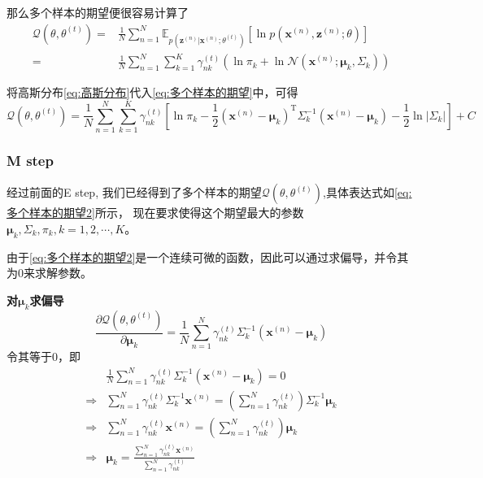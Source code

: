 \documentclass[withoutpreface,bwprint]{NoteBook}
\begin{document}
那么多个样本的期望便很容易计算了
\begin{align}
    \label{eq:多个样本的期望}
    \mathcal{Q}(\theta,\theta^{(t)}) 
    =& \frac{1}{N} \sum_{n=1}^{N} \mathbb{E}_{p(\mathbf{z}^{(n)}|\mathbf{x}^{(n)};\theta^{(t)})} \left[ \ln p(\mathbf{x}^{(n)},\mathbf{z}^{(n)};\theta)\right] \nonumber \\
    =& \frac{1}{N} \sum_{n=1}^{N} \sum_{k=1}^{K} \gamma_{nk}^{(t)} \left(\ln \pi_k + \ln \mathcal{N}(\mathbf{x}^{(n)}; \bm{\mu}_k,\Sigma_k )\right)
\end{align}

将高斯分布\cref{eq:高斯分布}代入\cref{eq:多个样本的期望}中，可得
\begin{equation}
    \label{eq:多个样本的期望2}
    \mathcal{Q}(\theta,\theta^{(t)}) 
    =  \frac{1}{N} \sum_{n=1}^{N} \sum_{k=1}^{K} \gamma_{nk}^{(t)} \left[ \ln \pi_k - \frac{1}{2} \left(\mathbf{x}^{(n)}-\bm{\mu}_k \right)^\mathrm{T} \Sigma_k^{-1} \left(\mathbf{x}^{(n)}-\bm{\mu}_k \right) - \frac{1}{2} \ln \left| \Sigma_k \right| \right] + C 
\end{equation}

\subsubsection{M step}

经过前面的E step, 我们已经得到了多个样本的期望$\mathcal{Q}(\theta,\theta^{(t)})$,具体表达式如\cref{eq:多个样本的期望2}所示，
现在要求使得这个期望最大的参数$\bm{\mu}_k,\Sigma_k, \pi_k, k=1,2,\cdots,K$。

由于\cref{eq:多个样本的期望2}是一个连续可微的函数，因此可以通过求偏导，并令其为0来求解参数。

\textbf{对$\bm{\mu}_k$求偏导}
\begin{equation}
    \label{eq:对均值mu求偏导} 
    \frac{\partial \mathcal{Q}(\theta,\theta^{(t)})}{\partial \bm{\mu}_k}
     = \frac{1}{N} \sum_{n=1}^N \gamma_{nk}^{(t)} \Sigma_k^{-1} \left(\mathbf{x}^{(n)}-\bm{\mu}_k \right)
\end{equation}
令其等于0，即
\begin{align}
    \label{eq:对均值mu求偏导后化简} 
    & \frac{1}{N} \sum_{n=1}^N \gamma_{nk}^{(t)} \Sigma_k^{-1} \left(\mathbf{x}^{(n)}-\bm{\mu}_k \right) = 0 \nonumber \\
    \Rightarrow & \sum_{n=1}^N \gamma_{nk}^{(t)} \Sigma_k^{-1} \mathbf{x}^{(n)} = \left( \sum_{n=1}^N \gamma_{nk}^{(t)} \right) \Sigma_k^{-1} \bm{\mu}_k \nonumber \\
    \Rightarrow & \sum_{n=1}^N \gamma_{nk}^{(t)} \mathbf{x}^{(n)} = \left( \sum_{n=1}^N \gamma_{nk}^{(t)} \right) \bm{\mu}_k \nonumber \\
    \Rightarrow & \bm{\mu}_k = \frac{ \sum_{n=1}^N \gamma_{nk}^{(t)} \mathbf{x}^{(n)} }{ \sum_{n=1}^N \gamma_{nk}^{(t)}}
\end{align}
\end{document}
